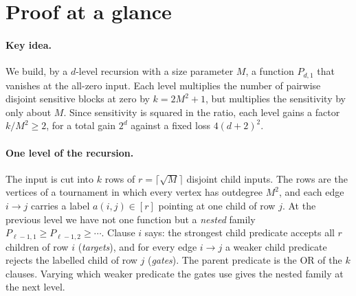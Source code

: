 \documentclass[11pt]{article}
\theoremstyle{definition}
\theoremstyle{remark}
\begin{document}
\section{Proof at a glance}
\label{sec:glance}

\paragraph{Key idea.}
We build, by a \(d\)-level recursion with a size parameter \(M\), a function
\(P_{d,1}\) that vanishes at the all-zero input. Each level multiplies the
number of pairwise disjoint sensitive blocks at zero by \(k=2M^2+1\), but
multiplies the sensitivity by only about \(M\). Since sensitivity is squared in
the ratio, each level gains a factor \(k/M^2\ge2\), for a total gain \(2^d\)
against a fixed loss \(4(d+2)^2\).

\paragraph{One level of the recursion.}
The input is cut into \(k\) rows of \(r=\lceil\sqrt M\rceil\) disjoint child
inputs. The rows are the vertices of a tournament in which every vertex has
outdegree \(M^2\), and each edge \(i\to j\) carries a label
\(a(i,j)\in[r]\) pointing at one child of row \(j\). At the previous level we
have not one function but a \emph{nested} family
\(P_{\ell-1,1}\ge P_{\ell-1,2}\ge\cdots\). Clause \(i\) says: the strongest
child predicate accepts all \(r\) children of row \(i\) (\emph{targets}), and
for every edge \(i\to j\) a weaker child predicate rejects the labelled child
of row \(j\) (\emph{gates}). The parent predicate is the OR of the \(k\)
clauses. Varying which weaker predicate the gates use gives the nested family
at the next level.
\end{document}
